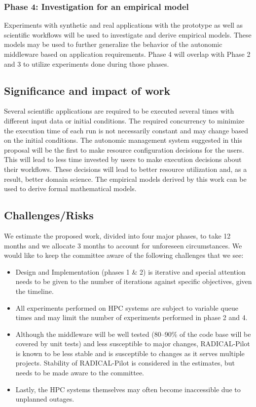 \subsubsection{Phase 4: Investigation for an empirical model}

Experiments with synthetic and real applications with the prototype as well as 
scientific workflows will be used to investigate and derive empirical models. 
These models may be used to further generalize the behavior of the autonomic 
middleware based on application requirements. Phase 4 will overlap with Phase 2 
and 3 to utilize experiments done during those phases.

\subsection{Significance and impact of work}
Several scientific applications are required to be executed several times with 
different input data or initial conditions. The required concurrency to minimize 
the execution time of each run is not necessarily constant and may change based 
on the initial conditions. The autonomic management system suggested in this 
proposal will be the first to make resource configuration decisions for the users. 
This will lead to less time invested by users to make execution decisions about 
their workflows. These decisions will lead to better resource utilization and, 
as a result, better domain science. The empirical models derived by this work can 
be used to derive formal mathematical models.

\subsection{Challenges/Risks}

We estimate the proposed work, divided into four major phases, to take 12 months 
and we allocate 3 months to account for unforeseen circumstances. We would like 
to keep the committee aware of the following challenges that we see:

\begin{itemize}
	\item Design and Implementation (phases 1 \& 2) is iterative and special attention 
	needs to be given to the number of iterations against specific objectives, 
	given the timeline.
  \item All experiments performed on HPC systems are subject to variable queue 
	times and may limit the number of experiments performed in phase 2 and 4.
	\item Although the middleware will be well tested (80--90\% of the code base 
	will be covered by unit tests) and less susceptible to major changes, RADICAL-Pilot 
	is known to be less stable and is susceptible to changes as it serves multiple 
	projects. Stability of RADICAL-Pilot is considered in the estimates, but needs 
	to be made aware to the committee.
	\item Lastly, the HPC systems themselves may often become inaccessible due to 
	unplanned outages.
\end{itemize}